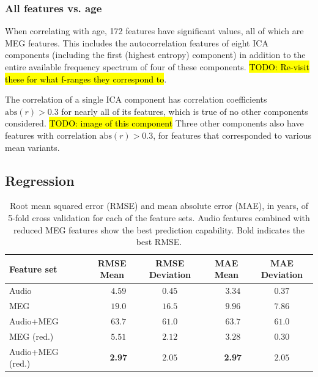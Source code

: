 \documentclass[utf8]{frontiersSCNS} %
\begin{document}
\subsubsection{All features vs. age}

When correlating with age, 172 features have significant values, all of which are MEG features. This includes the autocorrelation features of eight ICA components (including the first (highest entropy) component) in addition to the entire available frequency spectrum of four of these components. \hl{TODO: Re-visit these for what f-ranges they correspond to}.

The correlation of a single ICA component has correlation coefficients $\text{abs}(r)>0.3$ for nearly all of its features, which is true of no other components considered. \hl{TODO: image of this component} Three other components also have features with correlation $\text{abs}(r)>0.3$, for features that corresponded to various mean variants.

\subsection{Regression}

\begin{table}[t]
  \centering
  \label{tab:reg_results}
  \begin{tabular}{| l | c | c | c | c |}
    \toprule
    \textbf{Feature set} & \textbf{RMSE Mean} & \textbf{RMSE Deviation} & \textbf{MAE Mean} & \textbf{MAE Deviation}       \\
    \toprule
        Audio~~~                             & ~~~$4.59$         &     $0.45$     & ~~~$3.34$         &     $0.37$       \\
        MEG~~~                               & ~~~$19.0$         &     $16.5$     & ~~~$9.96$         &     $7.86$       \\
        Audio+MEG~~~                         & ~~~$63.7$         &     $61.0$     & ~~~$63.7$         &     $61.0$       \\

        \midrule
       
        MEG (red.)~~~                        & ~~~$5.51$         &     $2.12$    & ~~~$3.28$          &     $0.30$       \\
        Audio+MEG (red.)~~~                  & ~~~\textbf{2.97}  &     $2.05$    & ~~~\textbf{2.97}         &     $2.05$      \\

    \hline
  \end{tabular}
  \caption{Root mean squared error (RMSE) and mean absolute error (MAE), in years, of 5-fold cross validation for each of the feature sets. Audio features combined with reduced MEG features show the best prediction capability. Bold indicates the best RMSE.}
\end{table}
\end{document}
